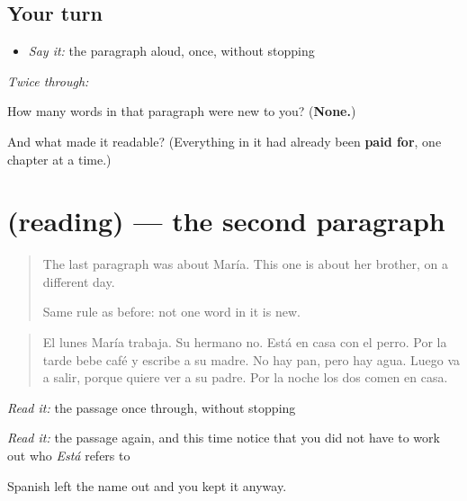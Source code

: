 \subsection*{Your turn}
\begin{itemize}
\raggedright
  \item \emph{Say it:} the paragraph aloud, once, without stopping
\end{itemize}

\emph{Twice through:}

\begin{tcolorbox}[breakable,colback=teal!4,colframe=teal!35!black,title={Before you move on}]
How many words in that paragraph were new to you? (\textbf{None.})

And what made it readable? (Everything in it had already been \textbf{paid for}, one chapter at a time.)
\end{tcolorbox}
\section[(reading)]{(reading) — the second paragraph}

\label{lesson:ES-C67-segunda-lectura}



\begin{quote}
The last paragraph was about María. This one is about her brother, on a different day.

Same rule as before: not one word in it is new.
\end{quote}

\begin{tcolorbox}[breakable,skin=enhanced,colback=orange!6,colframe=orange!45!black,boxrule=0.5pt,arc=1mm,left=6pt,right=6pt,top=4pt,bottom=4pt,fonttitle=\bfseries,title={Read this}]
\begin{quote}
El lunes María trabaja. Su hermano no. Está en casa con el perro. Por la tarde bebe café y escribe a su madre. No hay pan, pero hay agua. Luego va a salir, porque quiere ver a su padre. Por la noche los dos comen en casa.
\end{quote}

\emph{Read it:} the passage once through, without stopping

\emph{Read it:} the passage again, and this time notice that you did not have to work out who \emph{Está} refers to

Spanish left the name out and you kept it anyway.
\end{tcolorbox}

